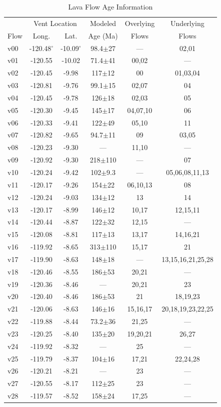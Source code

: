 \documentclass[12pt,letter]{article}
\begin{document}
	\begin{table}[h!]
	\centering
	\caption{Lava Flow Age Information}
	\begin{tabular}{l c c c c c}
		\toprule
			 & \multicolumn{2}{c}{Vent Location}  & Modeled & Overlying & Underlying\\
			Flow & Long. & Lat. & Age (Ma) & Flows & Flows\\
		\midrule
			v00 & -120.48$^{\circ}$ & -10.09$^{\circ}$ & 98.4$\pm$27 & --- & 02,01\\
			v01 & -120.55 & -10.02 & 71.4$\pm$41 & 00,02 & ---\\
			v02 & -120.45 & -9.98 & 117$\pm$12 & 00 & 01,03,04\\
			v03 & -120.81 & -9.76 & 99.1$\pm$15 & 02,07 & 04\\
			v04 & -120.45 & -9.78 & 126$\pm$18 & 02,03 & 05\\
			v05 & -120.30 & -9.45 & 145$\pm$17 & 04,07,10 & 06\\
			v06 & -120.33 & -9.41 & 122$\pm$49 & 05,10 & 11\\
			v07 & -120.82 & -9.65 & 94.7$\pm$11 & 09 & 03,05\\
			v08 & -120.23 & -9.30 & --- & 11,10 & ---\\
			v09 & -120.92 & -9.30 & 218$\pm$110 & --- & 07\\
			v10 & -120.24 & -9.42 & 102$\pm$9.3 & --- & 05,06,08,11,13\\
			v11 & -120.17 & -9.26 & 154$\pm$22 & 06,10,13 & 08\\
			v12 & -120.24 & -9.03 & 134$\pm$12 & 13 & 14\\
			v13 & -120.17 & -8.99 & 146$\pm$12 & 10,17 & 12,15,11\\
			v14 & -120.44 & -8.87 & 122$\pm$32 & 12,15 & ---\\
			v15 & -120.08 & -8.81 & 117$\pm$13 & 13,17 & 14,16,21\\
			v16 & -119.92 & -8.65 & 313$\pm$110 & 15,17 & 21\\
			v17 & -119.90 & -8.63 & 148$\pm$18 & --- & 13,15,16,21,25,28\\
			v18 & -120.46 & -8.55 & 186$\pm$53 & 20,21 & ---\\
			v19 & -120.36 & -8.46 & --- & 20,21 & 23\\
			v20 & -120.40 & -8.46 & 186$\pm$53 & 21 & 18,19,23\\
			v21 & -120.06 & -8.63 & 146$\pm$16 & 15,16,17 & 20,18,19,23,22,25\\
			v22 & -119.88 & -8.44 & 73.2$\pm$36 & 21,25 & ---\\
			v23 & -120.25 & -8.40 & 135$\pm$20 & 19,20,21 & 26,27\\
			v24 & -119.92 & -8.32 & --- & 25 & ---\\
			v25 & -119.79 & -8.37 & 104$\pm$16 & 17,21 & 22,24,28\\
			v26 & -120.21 & -8.21 & --- & 23 & ---\\
			v27 & -120.55 & -8.17 & 112$\pm$25 & 23 & ---\\
			v28 & -119.57 & -8.52 & 158$\pm$24 & 17,25 & ---\\
		\bottomrule
	\end{tabular}
	\label{tab_agedatabase}
	\end{table}
\end{document}
